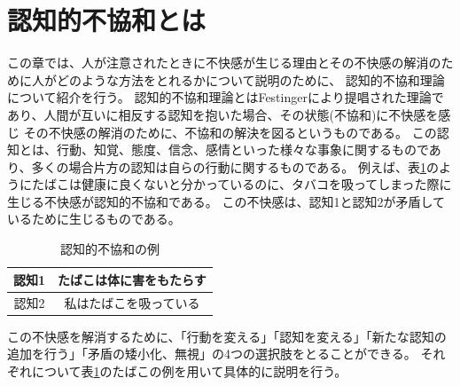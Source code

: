 \documentclass{kuisthesis}
\begin{document}
\section{認知的不協和とは} %
\label{sec: CDT}
この章では、人が注意されたときに不快感が生じる理由とその不快感の解消のために人がどのような方法をとれるかについて説明のために、
認知的不協和理論について紹介を行う。
認知的不協和理論\cite{Festinger1957}とはFestingerにより提唱された理論であり、人間が互いに相反する認知を抱いた場合、その状態(不協和)に不快感を感じ
その不快感の解消のために、不協和の解決を図るというものである。
この認知とは、行動、知覚、態度、信念、感情といった様々な事象に関するものであり、多くの場合片方の認知は自らの行動に関するものである。
例えば、表\ref{fig: CDTExample}のようにたばこは健康に良くないと分かっているのに、タバコを吸ってしまった際に生じる不快感が認知的不協和である。
この不快感は、認知1と認知2が矛盾しているために生じるものである。
\begin{table}[H]
  \centering\caption{認知的不協和の例}
  \label{fig: CDTExample}

  \begin{tabular}{c|c}
      認知1 & たばこは体に害をもたらす  \\ \hline
      認知2 & 私はたばこを吸っている \\ 
  \end{tabular}
  
\end{table}
この不快感を解消するために、「行動を変える」「認知を変える」「新たな認知の追加を行う」「矛盾の矮小化、無視」の4つの選択肢をとることができる。
それぞれについて表\ref{fig: CDTExample}のたばこの例を用いて具体的に説明を行う。
\end{document}
